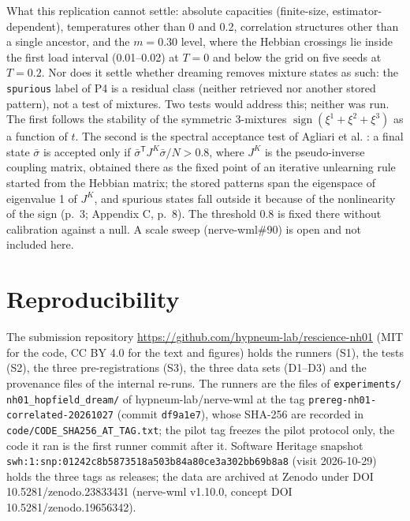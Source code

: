 What this replication cannot settle: absolute capacities (finite-size,
estimator-dependent), temperatures other than 0 and 0.2, correlation
structures other than a single ancestor, and the \(m = 0.30\) level,
where the Hebbian crossings lie inside the first load interval
(0.01--0.02) at \(T = 0\) and below the grid on five seeds at
\(T = 0.2\). Nor does it settle whether dreaming removes mixture states
as such: the \texttt{spurious} label of P4 is a residual class (neither
retrieved nor another stored pattern), not a test of mixtures. Two tests
would address this; neither was run. The first follows the stability of
the symmetric 3-mixtures \(\operatorname{sign}(\xi^1 + \xi^2 + \xi^3)\)
as a function of \(t\). The second is the spectral acceptance test of
Agliari et al. \supercite{agliari2025multichannel}: a final state
\(\bar\sigma\) is accepted only if
\(\bar\sigma^{\mathsf T} J^{K} \bar\sigma / N > 0.8\), where \(J^{K}\)
is the pseudo-inverse coupling matrix, obtained there as the fixed point
of an iterative unlearning rule started from the Hebbian matrix; the
stored patterns span the eigenspace of eigenvalue 1 of \(J^{K}\), and
spurious states fall outside it because of the nonlinearity of the sign
(p.~3; Appendix C, p.~8). The threshold 0.8 is fixed there without
calibration against a null. A scale sweep (nerve-wml\#90) is open and
not included here.

\section{Reproducibility}\label{reproducibility}

The submission repository
\url{https://github.com/hypneum-lab/rescience-nh01} (MIT for the code,
CC BY 4.0 for the text and figures) holds the runners (S1), the tests
(S2), the three pre-registrations (S3), the three data sets (D1--D3) and
the provenance files of the internal re-runs. The runners are the files
of \texttt{experiments/} \texttt{nh01\_hopfield\_dream/} of
hypneum-lab/nerve-wml at the tag
\texttt{prereg-nh01-correlated-20261027} (commit \texttt{df9a1e7}),
whose SHA-256 are recorded in \texttt{code/CODE\_SHA256\_AT\_TAG.txt};
the pilot tag freezes the pilot protocol only, the code it ran is the
first runner commit after it. Software Heritage snapshot
\texttt{swh:1:snp:\allowbreak{}0124\allowbreak{}2c8b\allowbreak{}5873\allowbreak{}518a\allowbreak{}503b\allowbreak{}84a8\allowbreak{}0ce3\allowbreak{}a302\allowbreak{}bb69\allowbreak{}b8a8}
(visit 2026-10-29) holds the three tags as releases; the data are
archived at Zenodo under DOI 10.5281/\allowbreak{}zenodo.23833431
(nerve-wml v1.10.0, concept DOI 10.5281/\allowbreak{}zenodo.19656342).

